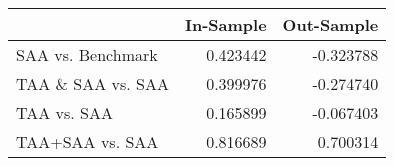 \begin{tabular}{lrr}
\toprule
{} &  In-Sample &  Out-Sample \\
\midrule
SAA vs. Benchmark &   0.423442 &   -0.323788 \\
TAA \& SAA vs. SAA &   0.399976 &   -0.274740 \\
TAA vs. SAA       &   0.165899 &   -0.067403 \\
TAA+SAA vs. SAA   &   0.816689 &    0.700314 \\
\bottomrule
\end{tabular}
